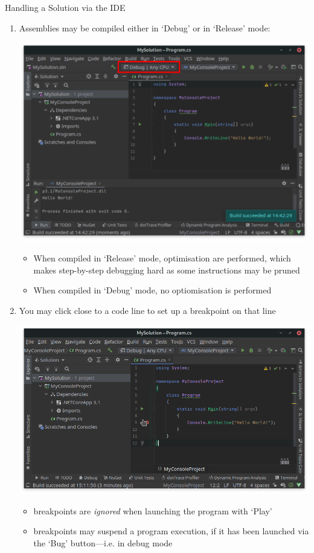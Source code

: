 \documentclass[presentation]{beamer}
\begin{document}
\begin{frame}[allowframebreaks]{Handling a Solution via the IDE}
\begin{enumerate}
        \framebreak

        \item Assemblies may be compiled either in \alert{`Debug'} or in \alert{`Release'} mode:
        \begin{center}
            \includegraphics[width=.6\linewidth]{img/rider-4c}
        \end{center}
        \begin{itemize}
            \item When compiled in `Release' mode, optimisation are performed, which makes step-by-step debugging hard as some instructions may be pruned
            \item When compiled in `Debug' mode, no optiomisation is performed
        \end{itemize}

        \framebreak

        \item You may click close to a code line to set up a \alert{breakpoint} on that line
        \begin{center}
            \includegraphics[width=.6\linewidth]{img/rider-5}
        \end{center}
        \begin{itemize}
            \item breakpoints are \emph{ignored} when launching the program with `Play'
            \item breakpoints may \alert{suspend} a program execution, if it has been launched via the `Bug' button---i.e. in \alert{debug mode}
        \end{itemize}


\end{enumerate}
\end{frame}
\end{document}
